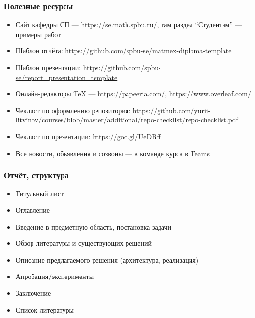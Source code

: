 \documentclass{../../slides-style}
\begin{document}
    \begin{frame}
        \frametitle{Полезные ресурсы}
        \begin{itemize}
            \item Сайт кафедры СП --- \url{https://se.math.spbu.ru/}, там раздел \enquote{Студентам} --- примеры работ
            \item Шаблон отчёта: \url{https://github.com/spbu-se/matmex-diploma-template}
            \item Шаблон презентации: \url{https://github.com/spbu-se/report_presentation_template}
            \item Онлайн-редакторы TeX --- \url{https://papeeria.com/}, \url{https://www.overleaf.com/}
            \item Чеклист по оформлению репозитория: \url{https://github.com/yurii-litvinov/courses/blob/master/additional/repo-checklist/repo-checklist.pdf}
            \item Чеклист по презентации: \url{https://goo.gl/UeDRff}
            \item Все новости, объявления и созвоны --- в команде курса в Teams
        \end{itemize}
    \end{frame}

    \begin{frame}
        \frametitle{Отчёт, структура}
        \begin{itemize}
            \item Титульный лист
            \item Оглавление
            \item Введение в предметную область, постановка задачи
            \item Обзор литературы и существующих решений
            \item Описание предлагаемого решения (архитектура, реализация)
            \item Апробация/эксперименты
            \item Заключение
            \item Список литературы
        \end{itemize}
    \end{frame}
\end{document}
